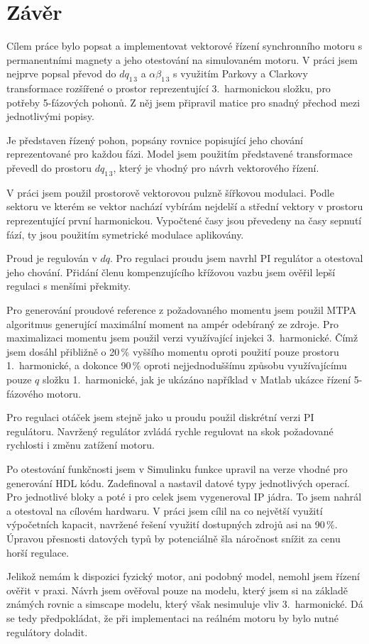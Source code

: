 \chapter*{Závěr}
{}

Cílem práce bylo popsat a implementovat vektorové řízení synchronního motoru s permanentními magnety a jeho otestování na simulovaném motoru. V práci jsem nejprve popsal převod do $dq_{1\,3}$ a $\alpha \beta_{1\,3}$ s využitím Parkovy a Clarkovy transformace rozšířené o prostor reprezentující 3.~harmonickou složku, pro potřeby 5-fázových pohonů. Z něj jsem připravil matice pro snadný přechod mezi jednotlivými popisy.

Je představen řízený pohon, popsány rovnice popisující jeho chování reprezentované pro každou fázi.
Model jsem použitím představené transformace převedl do prostoru $dq_{1\,3}$, který je vhodný pro návrh vektorového řízení.

V práci jsem použil prostorově vektorovou pulzně šířkovou modulaci. Podle sektoru ve kterém se vektor nachází vybírám nejdelší a střední vektory v prostoru reprezentující první harmonickou. Vypočtené časy jsou převedeny na časy sepnutí fází, ty jsou použitím symetrické modulace aplikovány.

Proud je regulován v $dq$. Pro regulaci proudu jsem navrhl PI regulátor a otestoval jeho chování. Přidání členu kompenzujícího křížovou vazbu jsem ověřil lepší regulaci s menšími překmity.

Pro generování proudové reference z požadovaného momentu jsem použil MTPA algoritmus generující maximální moment na ampér odebíraný ze zdroje. Pro maximalizaci momentu jsem použil verzi využívající injekci 3.~harmonické. Čímž jsem dosáhl přibližně o 20\,\% vyššího momentu oproti použití pouze prostoru 1.~harmonické, a dokonce 90\,\% oproti nejjednoduššímu způsobu využívajícímu pouze $q$ složku 1.~harmonické, jak je ukázáno například v Matlab ukázce řízení 5-fázového motoru.

Pro regulaci otáček jsem stejně jako u proudu použil diskrétní verzi PI regulátoru. Navržený regulátor zvládá rychle regulovat na skok požadované rychlosti i změnu zatížení motoru.

Po otestování funkčnosti jsem v Simulinku funkce upravil na verze vhodné pro generování HDL kódu. Zadefinoval a nastavil datové typy jednotlivých operací. Pro jednotlivé bloky a poté i pro celek jsem vygeneroval IP jádra. To jsem nahrál a otestoval na cílovém hardwaru. V práci jsem cílil na co největší využití výpočetních kapacit, navržené řešení využití dostupných zdrojů asi na 90\,\%. Úpravou přesnosti datových typů by potenciálně šla náročnost snížit za cenu horší regulace.

Jelikož nemám k dispozici fyzický motor, ani podobný model, nemohl jsem řízení ověřit v praxi. Návrh jsem ověřoval pouze na modelu, který jsem si na základě známých rovnic a simscape modelu, který však nesimuluje vliv 3.~harmonické. Dá se tedy předpokládat, že při implementaci na reálném motoru by bylo nutné regulátory doladit.
